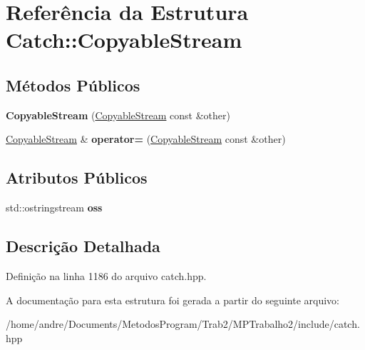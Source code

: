 \hypertarget{structCatch_1_1CopyableStream}{}\section{Referência da Estrutura Catch\+:\+:Copyable\+Stream}
\label{structCatch_1_1CopyableStream}
\subsection*{Métodos Públicos}
\begin{DoxyCompactItemize}
\item 
{\bfseries Copyable\+Stream} (\hyperlink{structCatch_1_1CopyableStream}{Copyable\+Stream} const \&other)\hypertarget{structCatch_1_1CopyableStream_a0e72dc16240653f52c17106f4bf34da8}{}\label{structCatch_1_1CopyableStream_a0e72dc16240653f52c17106f4bf34da8}

\item 
\hyperlink{structCatch_1_1CopyableStream}{Copyable\+Stream} \& {\bfseries operator=} (\hyperlink{structCatch_1_1CopyableStream}{Copyable\+Stream} const \&other)\hypertarget{structCatch_1_1CopyableStream_a1760fa29b38011c5845171260bec0966}{}\label{structCatch_1_1CopyableStream_a1760fa29b38011c5845171260bec0966}

\end{DoxyCompactItemize}
\subsection*{Atributos Públicos}
\begin{DoxyCompactItemize}
\item 
std\+::ostringstream {\bfseries oss}\hypertarget{structCatch_1_1CopyableStream_ae123fb4d673e7d7a13a3c5f6bc5d426c}{}\label{structCatch_1_1CopyableStream_ae123fb4d673e7d7a13a3c5f6bc5d426c}

\end{DoxyCompactItemize}


\subsection{Descrição Detalhada}


Definição na linha 1186 do arquivo catch.\+hpp.



A documentação para esta estrutura foi gerada a partir do seguinte arquivo\+:\begin{DoxyCompactItemize}
\item 
/home/andre/\+Documents/\+Metodos\+Program/\+Trab2/\+M\+P\+Trabalho2/include/catch.\+hpp\end{DoxyCompactItemize}
